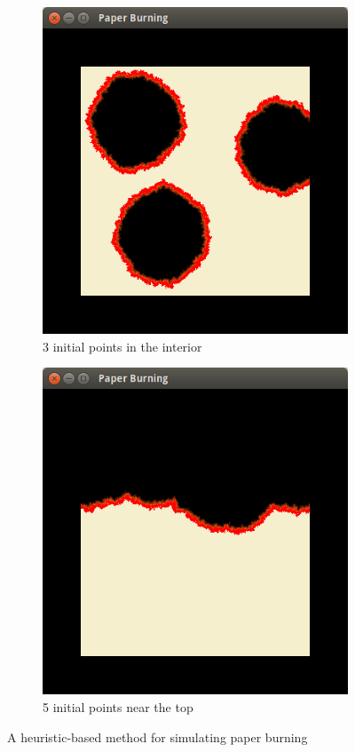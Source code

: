 \documentclass[12pt]{report}
\begin{document}
\begin{figure}[H]
\centering
\begin{subfigure}{.48\textwidth}
  \centering
  \includegraphics[width=\linewidth]{img/paper1}
  \caption{3 initial points in the interior}
\end{subfigure}
\begin{subfigure}{.48\textwidth}
  \centering
  \includegraphics[width=\linewidth]{img/paper2}
  \caption{5 initial points near the top}
\end{subfigure}
\caption{A heuristic-based method for simulating paper burning}
\label{fig:paperburn}
\end{figure}
\end{document}
